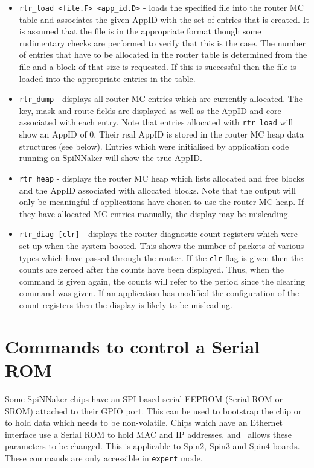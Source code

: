 \begin{itemize}

\item
\texttt{rtr\_load <file.F> <app\_id.D>} - loads the specified file
into the router MC table and associates the given AppID with the set
of entries that is created. It is assumed that the file is in the
appropriate format though some rudimentary checks are performed to
verify that this is the case. The number of entries that have to be
allocated in the router table is determined from the file and a block
of that size is requested. If this is successful then the file is
loaded into the appropriate entries in the table.

\item
\texttt{rtr\_dump} - displays all router MC entries which are
currently allocated. The key, mask and route fields are displayed as
well as the AppID and core associated with each entry. Note that
entries allocated with \texttt{rtr\_load} will show an AppID of
0. Their real AppID is stored in the router MC heap data structures
(see below).  Entries which were initialised by application code
running on SpiNNaker will show the true AppID.

\item
\texttt{rtr\_heap} - displays the router MC heap which lists allocated
and free blocks and the AppID associated with allocated blocks. Note
that the output will only be meaningful if applications have chosen to
use the router MC heap. If they have allocated MC entries manually,
the display may be misleading.

\item
\texttt{rtr\_diag [clr]} - displays the router diagnostic count registers
which were set up when the system booted. This shows the number of
packets of various types which have passed through the router. If the
\texttt{clr} flag is given then the counts are zeroed after the
counts have been displayed. Thus, when the command is given again, the
counts will refer to the period since the clearing command was given.
If an application has modified the configuration of the count
registers then the display is likely to be misleading.

\end{itemize}

\section{Commands to control a Serial ROM}

Some SpiNNaker chips have an SPI-based serial EEPROM (Serial ROM or
SROM) attached to their GPIO port. This can be used to bootstrap the
chip or to hold data which needs to be non-volatile. Chips which have
an Ethernet interface use a Serial ROM to hold MAC and IP addresses.
and \ybug\ allows these parameters to be changed. This is applicable
to Spin2, Spin3 and Spin4 boards. These commands are only accessible
in \texttt{expert} mode.

